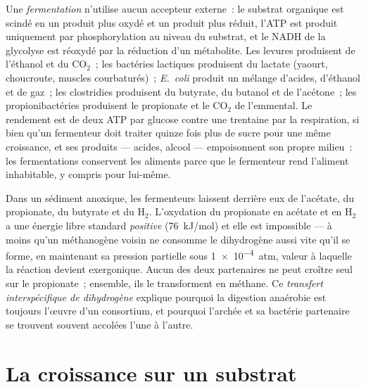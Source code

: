 \begin{definition}\label{def:b2:microbial-metabolism:fermentation}
Une \emph{fermentation} n'utilise aucun accepteur externe~: le substrat
organique est scindé en un produit plus oxydé et un produit plus
réduit, l'ATP est produit uniquement par phosphorylation au niveau du
substrat, et le NADH de la glycolyse est réoxydé par la réduction d'un
métabolite. Les levures produisent de l'éthanol et du
$\mathrm{CO_2}$~; les bactéries lactiques produisent du lactate
(yaourt, choucroute, muscles courbaturés)~; \emph{E.~coli} produit un
mélange d'acides, d'éthanol et de gaz~; les clostridies produisent du
butyrate, du butanol et de l'acétone~; les propionibactéries produisent
le propionate et le $\mathrm{CO_2}$ de l'emmental. Le rendement est de
deux ATP par glucose contre une trentaine par la respiration, si bien
qu'un fermenteur doit traiter quinze fois plus de sucre pour une même
croissance, et ses produits --- acides, alcool --- empoisonnent son
propre milieu~: les fermentations conservent les aliments parce que le
fermenteur rend l'aliment inhabitable, y compris pour lui-même.
\end{definition}

\begin{example}\label{ex:b2:microbial-metabolism:syntrophy}
Dans un sédiment anoxique, les fermenteurs laissent derrière eux de
l'acétate, du propionate, du butyrate et du $\mathrm{H_2}$. L'oxydation
du propionate en acétate et en
$\mathrm{H_2}$ a une énergie libre standard \emph{positive}
(\qty{+76}{kJ/mol}) et elle est impossible --- à moins qu'un méthanogène
voisin ne consomme le dihydrogène aussi vite qu'il se forme, en
maintenant sa pression partielle sous \qty{1e-4}{atm}, valeur à laquelle
la réaction devient exergonique. Aucun des deux partenaires ne peut
croître seul sur le propionate~; ensemble, ils le transforment en
méthane. Ce \emph{transfert interspécifique de dihydrogène} explique
pourquoi la digestion anaérobie est toujours l'œuvre d'un consortium,
et pourquoi l'archée et sa bactérie partenaire se trouvent souvent
accolées l'une à l'autre.
\end{example}

\section{La croissance sur un substrat}


